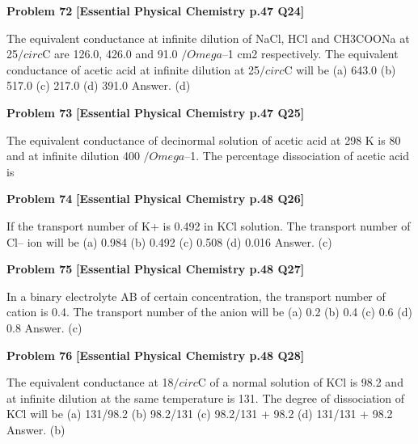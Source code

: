 \begin{problembox}
\textbf{Problem 72} \hfill \textbf{[Essential Physical Chemistry p.47 Q24]}
\label{q:ext-essential_all_questions-72}

The equivalent conductance at infinite dilution of NaCl, HCl and CH3COONa at 25$/circ$C are 126.0, 426.0
and 91.0 $/Omega$--1 cm2 respectively. The equivalent conductance of acetic acid at infinite dilution at 25$/circ$C
will be
(a)
643.0
(b)
517.0
(c)
217.0
(d)
391.0
Answer. (d)
\end{problembox}

\begin{problembox}
\textbf{Problem 73} \hfill \textbf{[Essential Physical Chemistry p.47 Q25]}
\label{q:ext-essential_all_questions-73}

The equivalent conductance of decinormal solution of acetic acid at 298 K is 80 and at infinite dilution
400 $/Omega$--1. The percentage dissociation of acetic acid is
\end{problembox}

\begin{problembox}
\textbf{Problem 74} \hfill \textbf{[Essential Physical Chemistry p.48 Q26]}
\label{q:ext-essential_all_questions-74}

If the transport number of K+ is 0.492 in KCl solution. The transport number of Cl-- ion will be
(a)
0.984
(b)
0.492
(c)
0.508
(d)
0.016
Answer. (c)
\end{problembox}

\begin{problembox}
\textbf{Problem 75} \hfill \textbf{[Essential Physical Chemistry p.48 Q27]}
\label{q:ext-essential_all_questions-75}

In a binary electrolyte AB of certain concentration, the transport number of cation is 0.4. The transport
number of the anion will be
(a)
0.2
(b)
0.4
(c)
0.6
(d)
0.8
Answer. (c)
\end{problembox}

\begin{problembox}
\textbf{Problem 76} \hfill \textbf{[Essential Physical Chemistry p.48 Q28]}
\label{q:ext-essential_all_questions-76}

The equivalent conductance at 18$/circ$C of a normal solution of KCl is 98.2 and at infinite dilution at the
same temperature is 131. The degree of dissociation of KCl will be
(a)
131/98.2
(b)
98.2/131
(c)
98.2/131 + 98.2
(d)
131/131 + 98.2
Answer. (b)
\end{problembox}


